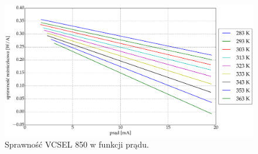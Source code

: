 \begin{figure}
\center
  \includegraphics[scale=0.30]{plot_vcsel_850/plot_eff_all_via_current.eps}
  \caption{Sprawność VCSEL 850 w funkcji prądu.}
  \label{fig:plot_eff_all_via_current_vcsel850}
\end{figure}
\newpage
